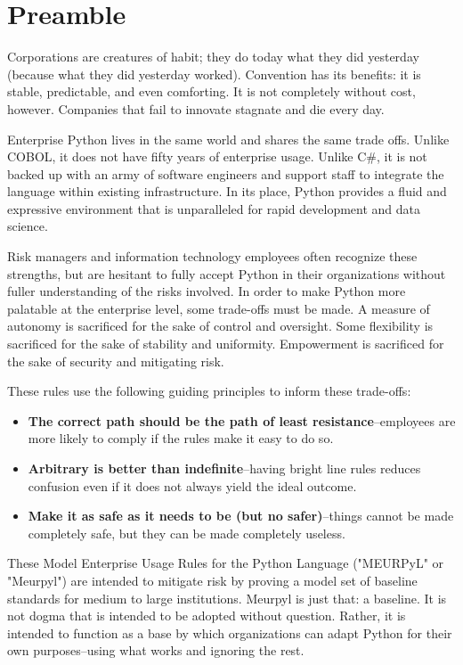 \section*{Preamble}
\thispagestyle{preamble_style}

Corporations are creatures of habit; they do today what they did yesterday (because what they did yesterday worked). Convention has its benefits: it is stable, predictable, and even comforting. It is not completely without cost, however. Companies that fail to innovate stagnate and die every day.

Enterprise Python lives in the same world and shares the same trade offs. Unlike COBOL, it does not have fifty years of enterprise usage. Unlike C\#, it is not backed up with an army of software engineers and support staff to integrate the language within existing infrastructure. In its place, Python provides a fluid and expressive environment that is unparalleled for rapid development and data science.

Risk managers and information technology employees often recognize these strengths, but are hesitant to fully accept Python in their organizations without fuller understanding of the risks involved. In order to make Python more palatable at the enterprise level, some trade-offs must be made. A measure of autonomy is sacrificed for the sake of control and oversight. Some flexibility is sacrificed for the sake of stability and uniformity. Empowerment is sacrificed for the sake of security and mitigating risk. 

These rules use the following guiding principles to inform these trade-offs:

\begin{itemize}
	\item \textbf{The correct path should be the path of least resistance}--employees are more likely to comply if the rules make it easy to do so.
	\item \textbf{Arbitrary is better than indefinite}--having bright line rules reduces confusion even if it does not always yield the ideal outcome.
	\item \textbf{Make it as safe as it needs to be (but no safer)}--things cannot be made completely safe, but they can be made completely useless.
\end{itemize}

These Model Enterprise Usage Rules for the Python Language ("MEURPyL" or "Meurpyl") are intended to mitigate risk by proving a model set of baseline standards for medium to large institutions. Meurpyl is just that: a baseline. It is not dogma that is intended to be adopted without question. Rather, it is intended to function as a base by which organizations can adapt Python for their own purposes--using what works and ignoring the rest.
